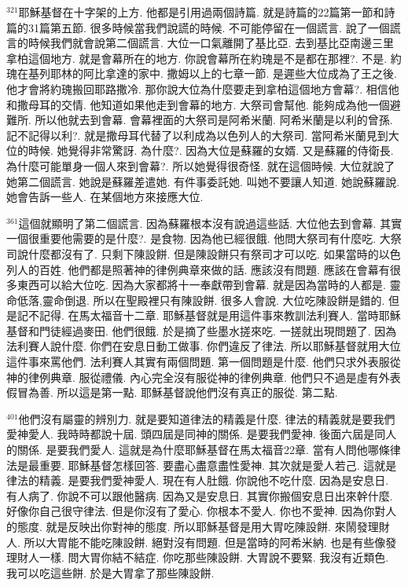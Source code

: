 \documentclass{book}
\begin{document}
$^{321}$耶穌基督在十字架的上方.
他都是引用過兩個詩篇.
就是詩篇的22篇第一節和詩篇的31篇第五節.
很多時候當我們說謊的時候.
不可能停留在一個謊言.
說了一個謊言的時候我們就會說第二個謊言.
大位一口氣離開了基比亞.
去到基比亞南邊三里拿柏這個地方.
就是會幕所在的地方.
你說會幕所在約瑰是不是都在那裡?.
不是.
約瑰在基列耶林的阿比拿達的家中.
撒姆以上的七章一節.
是遲些大位成為了王之後.
他才會將約瑰搬回耶路撒冷.
那你說大位為什麼要走到拿柏這個地方會幕?.
相信他和撒母耳的交情.
他知道如果他走到會幕的地方.
大祭司會幫他.
能夠成為他一個避難所.
所以他就去到會幕.
會幕裡面的大祭司是阿希米蘭.
阿希米蘭是以利的曾孫.
記不記得以利?.
就是撒母耳代替了以利成為以色列人的大祭司.
當阿希米蘭見到大位的時候.
她覺得非常驚訝.
為什麼?.
因為大位是蘇羅的女婿.
又是蘇羅的侍衛長.
為什麼可能單身一個人來到會幕?.
所以她覺得很奇怪.
就在這個時候.
大位就說了她第二個謊言.
她說是蘇羅差遣她.
有件事委託她.
叫她不要讓人知道.
她說蘇羅說.
她會告訴一些人.
在某個地方來接應大位.

$^{361}$這個就顯明了第二個謊言.
因為蘇羅根本沒有說過這些話.
大位他去到會幕.
其實一個很重要他需要的是什麼?.
是食物.
因為他已經很餓.
他問大祭司有什麼吃.
大祭司說什麼都沒有了.
只剩下陳設餅.
但是陳設餅只有祭司才可以吃.
如果當時的以色列人的百姓.
他們都是照著神的律例典章來做的話.
應該沒有問題.
應該在會幕有很多東西可以給大位吃.
因為大家都將十一奉獻帶到會幕.
就是因為當時的人都是.
靈命低落,靈命倒退.
所以在聖殿裡只有陳設餅.
很多人會說.
大位吃陳設餅是錯的.
但是記不記得.
在馬太福音十二章.
耶穌基督就是用這件事來教訓法利賽人.
當時耶穌基督和門徒經過麥田.
他們很餓.
於是摘了些墨水搓來吃.
一搓就出現問題了.
因為法利賽人說什麼.
你們在安息日動工做事.
你們違反了律法.
所以耶穌基督就用大位這件事來罵他們.
法利賽人其實有兩個問題.
第一個問題是什麼.
他們只求外表服從神的律例典章.
服從禮儀.
內心完全沒有服從神的律例典章.
他們只不過是虛有外表假冒為善.
所以這是第一點.
耶穌基督說他們沒有真正的服從.
第二點.

$^{401}$他們沒有屬靈的辨別力.
就是要知道律法的精義是什麼.
律法的精義就是要我們愛神愛人.
我時時都說十屆.
頭四屆是同神的關係.
是要我們愛神.
後面六屆是同人的關係.
是要我們愛人.
這就是為什麼耶穌基督在馬太福音22章.
當有人問他哪條律法是最重要.
耶穌基督怎樣回答.
要盡心盡意盡性愛神.
其次就是愛人若己.
這就是律法的精義.
是要我們愛神愛人.
現在有人肚餓.
你說他不吃什麼.
因為是安息日.
有人病了.
你說不可以跟他醫病.
因為又是安息日.
其實你搬個安息日出來幹什麼.
好像你自己很守律法.
但是你沒有了愛心.
你根本不愛人.
你也不愛神.
因為你對人的態度.
就是反映出你對神的態度.
所以耶穌基督是用大胃吃陳設餅.
來鬧發理財人.
所以大胃能不能吃陳設餅.
絕對沒有問題.
但是當時的阿希米納.
也是有些像發理財人一樣.
問大胃你結不結症.
你吃那些陳設餅.
大胃說不要緊.
我沒有近類色.
我可以吃這些餅.
於是大胃拿了那些陳設餅.
\end{document}
